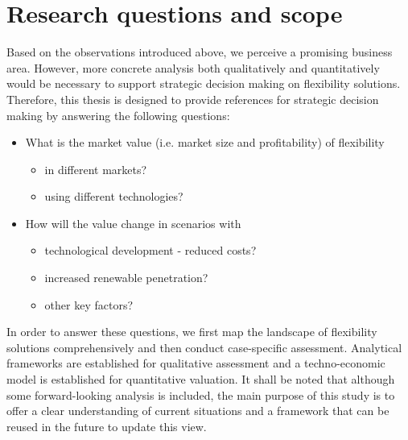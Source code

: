 
\section{Research questions and scope}

Based on the observations introduced above, we perceive a promising business area. However, more concrete analysis both qualitatively and quantitatively would be necessary to support strategic decision making on flexibility solutions. Therefore, this thesis is designed to provide references for strategic decision making by answering the following questions:

\begin{itemize}
	\item What is the market value (i.e. market size and profitability) of flexibility
	\begin{itemize}
		\item in different markets?
		\item using different technologies?
	\end{itemize}
	\item How will the value change in scenarios with
	\begin{itemize}
		\item technological development - reduced costs?
		\item increased renewable penetration?
		\item other key factors?
	\end{itemize}
\end{itemize}

In order to answer these questions, we first map the landscape of flexibility solutions comprehensively and then conduct case-specific assessment. Analytical frameworks are established for qualitative assessment and a techno-economic model is established for quantitative valuation. It shall be noted that although some forward-looking analysis is included, the main purpose of this study is to offer a clear understanding of current situations and a framework that can be reused in the future to update this view.

